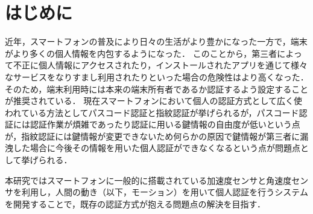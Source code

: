 \section{はじめに}
近年，スマートフォンの普及により日々の生活がより豊かになった一方で，端末がより多くの個人情報を内包するようになった．
このことから，第三者によって不正に個人情報にアクセスされたり，インストールされたアプリを通じて様々なサービスをなりすまし利用されたりといった場合の危険性はより高くなった．
そのため，端末利用時には本来の端末所有者であるか認証するよう設定することが推奨されている．
現在スマートフォンにおいて個人の認証方式として広く使われている方法としてパスコード認証と指紋認証が挙げられるが，パスコード認証には認証作業が煩雑であったり認証に用いる鍵情報の自由度が低いという点が，指紋認証には鍵情報が変更できないため何らかの原因で鍵情報が第三者に漏洩した場合に今後その情報を用いた個人認証ができなくなるという点が問題点として挙げられる．

本研究ではスマートフォンに一般的に搭載されている加速度センサと角速度センサを利用し，人間の動き（以下，モーション）を用いて個人認証を行うシステムを開発することで，既存の認証方式が抱える問題点の解決を目指す．
